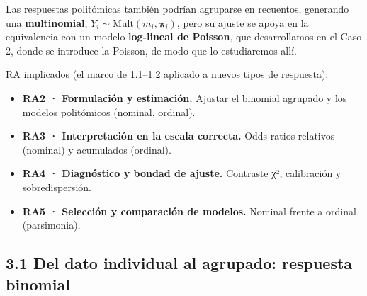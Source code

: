 \documentclass[
  letterpaper,
  DIV=11,
  numbers=noendperiod]{scrartcl}
\providecommand{\tightlist}{%
  \setlength{\itemsep}{0pt}\setlength{\parskip}{0pt}}\usepackage{longtable,booktabs,array}
\begin{document}
\begin{tcolorbox}[enhanced jigsaw, coltitle=black, rightrule=.15mm, arc=.35mm, leftrule=.75mm, colback=white, colbacktitle=quarto-callout-tip-color!10!white, left=2mm, breakable, toptitle=1mm, toprule=.15mm, bottomtitle=1mm, titlerule=0mm, title=\textcolor{quarto-callout-tip-color}{\faLightbulb}\hspace{0.5em}{Tip}, bottomrule=.15mm, opacityback=0, opacitybacktitle=0.6, colframe=quarto-callout-tip-color-frame]

Las respuestas politómicas también podrían agruparse en recuentos,
generando una \textbf{multinomial},
\(Y_i\sim\mathrm{Mult}(m_i,\boldsymbol{\pi}_i)\), pero su ajuste se
apoya en la equivalencia con un modelo \textbf{log-lineal de Poisson},
que desarrollamos en el Caso 2, donde se introduce la Poisson, de modo
que lo estudiaremos allí.

\end{tcolorbox}

\begin{tcolorbox}[enhanced jigsaw, coltitle=black, rightrule=.15mm, arc=.35mm, leftrule=.75mm, colback=white, colbacktitle=quarto-callout-note-color!10!white, left=2mm, breakable, toptitle=1mm, toprule=.15mm, bottomtitle=1mm, titlerule=0mm, title=\textcolor{quarto-callout-note-color}{\faInfo}\hspace{0.5em}{Sobre esta unidad}, bottomrule=.15mm, opacityback=0, opacitybacktitle=0.6, colframe=quarto-callout-note-color-frame]

RA implicados (el marco de 1.1--1.2 aplicado a nuevos tipos de
respuesta):

\begin{itemize}
\tightlist
\item
  \textbf{RA2 · Formulación y estimación.} Ajustar el binomial agrupado
  y los modelos politómicos (nominal, ordinal).
\item
  \textbf{RA3 · Interpretación en la escala correcta.} Odds ratios
  relativos (nominal) y acumulados (ordinal).
\item
  \textbf{RA4 · Diagnóstico y bondad de ajuste.} Contraste χ²,
  calibración y sobredispersión.
\item
  \textbf{RA5 · Selección y comparación de modelos.} Nominal frente a
  ordinal (parsimonia).
\end{itemize}

\end{tcolorbox}

\hypertarget{sec-u13-binomial}{%
\subsection{3.1 Del dato individual al agrupado: respuesta
binomial}\label{sec-u13-binomial}}
\end{document}
